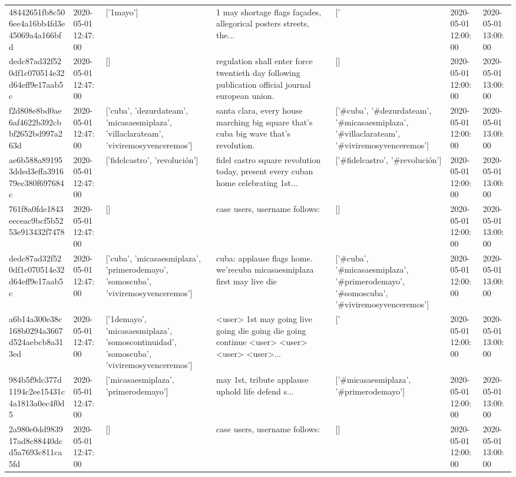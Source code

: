 \begin{tabular}{lllllll}
48442651fb8c506ee4a16bb4fd3e45069a4a166bfd & 2020-05-01 12:47:00 & ['1mayo'] & 1 may shortage flags façades, allegorical posters streets, the... & ['#1mayo'] & 2020-05-01 12:00:00 & 2020-05-01 13:00:00 \\
dedc87ad32f520df1c070514e32d64eff9e17aab5c & 2020-05-01 12:47:00 & [] & regulation shall enter force twentieth day following publication official journal european union. & [] & 2020-05-01 12:00:00 & 2020-05-01 13:00:00 \\
f2d808e8bd0ae6af4622b392cbbf2652bd997a263d & 2020-05-01 12:47:00 & ['cuba', 'dezurdateam', 'micasaesmiplaza', 'villaclarateam', 'viviremosyvenceremos'] & santa clara, every house marching big square that's cuba big wave that's revolution. & ['#cuba', '#dezurdateam', '#micasaesmiplaza', '#villaclarateam', '#viviremosyvenceremos'] & 2020-05-01 12:00:00 & 2020-05-01 13:00:00 \\
ae6b588a891953dded3effa391679ec380f697684c & 2020-05-01 12:47:00 & ['fidelcastro', 'revolución'] & fidel castro square revolution today, present every cuban home celebrating 1st... & ['#fidelcastro', '#revolución'] & 2020-05-01 12:00:00 & 2020-05-01 13:00:00 \\
761f8a0fde1843eeceac9bcf5b5253e913432f7478 & 2020-05-01 12:47:00 & [] & case users, username follows: & [] & 2020-05-01 12:00:00 & 2020-05-01 13:00:00 \\
dedc87ad32f520df1c070514e32d64eff9e17aab5c & 2020-05-01 12:47:00 & ['cuba', 'micasaesmiplaza', 'primerodemayo', 'somoscuba', 'viviremosyvenceremos'] & cuba: applause flags home. we'recuba micasaesmiplaza first may live die & ['#cuba', '#micasaesmiplaza', '#primerodemayo', '#somoscuba', '#viviremosyvenceremos'] & 2020-05-01 12:00:00 & 2020-05-01 13:00:00 \\
a6b14a300e38c168b0294a3667d524aebcb8a313ed & 2020-05-01 12:47:00 & ['1demayo', 'micasaesmiplaza', 'somoscontinuidad', 'somoscuba', 'viviremosyvenceremos'] & <user> 1st may going live going die going die going continue <user> <user> <user> <user>... & ['#1demayo', '#micasaesmiplaza', '#somoscontinuidad', '#somoscuba', '#viviremosyvenceremos'] & 2020-05-01 12:00:00 & 2020-05-01 13:00:00 \\
984b5f9dc377d1194c2ee15431c4a1813a0ec4f0d5 & 2020-05-01 12:47:00 & ['micasaesmiplaza', 'primerodemayo'] & may 1st, tribute applause uphold life defend s... & ['#micasaesmiplaza', '#primerodemayo'] & 2020-05-01 12:00:00 & 2020-05-01 13:00:00 \\
2a980e0dd983917ad8c88440dcd5a7693c811ca5fd & 2020-05-01 12:47:00 & [] & case users, username follows: & [] & 2020-05-01 12:00:00 & 2020-05-01 13:00:00 \\

\end{tabular}
